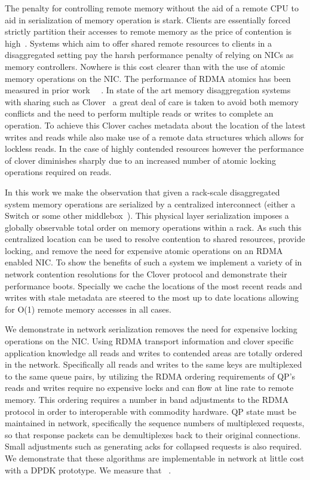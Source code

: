 The penalty for controlling remote memory without the aid of a remote CPU to aid
in serialization of memory operation is stark. Clients are essentially forced
strictly partition their accesses to remote memory as the price of contention is
high~\cite{legoos, reigons}. Systems which aim to offer shared remote
resources to clients in a disaggregated setting pay the harsh performance
penalty of relying on NICs as memory controllers. Nowhere is this cost clearer
than with the use of atomic memory operations on the NIC. The performance of
RDMA atomics has been measured in prior work ~\cite{design-guidelines}~\cite{clover}. In state of the art memory disaggregation systems with
sharing such as Clover~\cite{clover} a great deal of care is taken to avoid both
memory conflicts and the need to perform multiple reads or writes to complete an
operation. To achieve this Clover caches metadata about the location of the
latest writes and reads while also make use of a remote data structures which
allows for lockless reads. In the case of highly contended resources however the
performance of clover diminishes sharply due to an increased number of atomic
locking operations required on reads.

In this work we make the observation that given a rack-scale disaggregated
system memory operations are serialized by a centralized interconnect (either a
Switch or some other middlebox~\cite{disandapp}). This
physical layer serialization imposes a globally observable total order on memory
operations within a rack. As such this centralized location can be used to
resolve contention to shared resources, provide locking, and remove the need for
expensive atomic operations on an RDMA enabled NIC. To show the benefits of such
a system we implement a variety of in network contention resolutions for the
Clover protocol and demonstrate their performance boots. Specially we cache the
locations of the most recent reads and writes with stale metadata are steered to
the most up to date locations allowing for O(1) remote memory accesses in all
cases.

We demonstrate in network serialization removes the need for expensive locking
operations on the NIC. Using RDMA transport information and clover specific
application knowledge all reads and writes to contended areas are totally
ordered in the network. Specifically all reads and writes to the same keys are
multiplexed to the same queue pairs, by utilizing the RDMA ordering requirements
of QP's reads and writes require no expensive locks and can flow at line rate to
remote memory. This ordering requires a number in band adjustments to the RDMA
protocol in order to interoperable with commodity hardware. QP state must be
maintained in network, specifically the sequence numbers of multiplexed
requests, so that response packets can be demultiplexes back to their original
connections. Small adjustments such as generating acks for collapsed requests is
also required. We demonstrate that these algorithms are implementable in network
at little cost with a DPDK prototype. We measure that ~.
